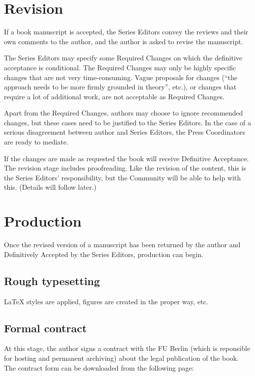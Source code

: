 \section{Revision}

If a book manuscript is accepted, the Series Editors convey the reviews and their own comments to
the author, and the author is asked to revise the manuscript.

The Series Editors may specify some Required Changes on which the definitive acceptance is
conditional. The Required Changes may only be highly specific changes that are not very
time-consuming. Vague proposals for changes (``the approach needs to be more firmly grounded in
theory'', etc.), or changes that require a lot of additional work, are not acceptable as Required Changes.

Apart from the Required Changes, authors may choose to ignore recommended changes, but these cases
need to be justified to the Series Editors. In the case of a serious disagreement between author and
Series Editors, the Press Coordinators are ready to mediate.

If the changes are made as requested the book will receive Definitive Acceptance.  The revision
stage includes proofreading. Like the revision of the content, this is the Series Editors'
responsibility, but the \lsp Community will be able to help with this. (Details will follow later.)

\section{Production}

Once the revised version of a manuscript has been returned by the author and Definitively Accepted
by the Series Editors, production can begin.

\subsection{Rough typesetting}

LaTeX styles are applied, figures are created in the proper way, etc.

\subsection{Formal contract}

At this stage, the author signs a contract with the FU Berlin (which is reponsible for hosting and permanent archiving) about the legal publication of the book. The contract form can be downloaded from the following page:

